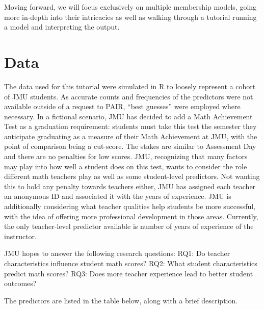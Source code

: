 \documentclass[
]{book}
\begin{document}
Moving forward, we will focus exclusively on multiple membership models, going more in-depth into their intricacies as well as walking through a tutorial running a model and interpreting the output.

\hypertarget{data}{%
\chapter{Data}\label{data}}

The data used for this tutorial were simulated in R to loosely represent a cohort of JMU students. As accurate counts and frequencies of the predictors were not available outside of a request to PAIR, ``best guesses'' were employed where necessary. In a fictional scenario, JMU has decided to add a Math Achievement Test as a graduation requirement: students must take this test the semester they anticipate graduating as a measure of their Math Achievement at JMU, with the point of comparison being a cut-score. The stakes are similar to Assessment Day and there are no penalties for low scores. JMU, recognizing that many factors may play into how well a student does on this test, wants to consider the role different math teachers play as well as some student-level predictors. Not wanting this to hold any penalty towards teachers either, JMU has assigned each teacher an anonymous ID and associated it with the years of experience. JMU is additionally considering what teacher qualities help students be more successful, with the idea of offering more professional development in those areas. Currently, the only teacher-level predictor available is number of years of experience of the instructor.

JMU hopes to answer the following research questions:
RQ1: Do teacher characteristics influence student math scores?
RQ2: What student characteristics predict math scores?
RQ3: Does more teacher experience lead to better student outcomes?

The predictors are listed in the table below, along with a brief description.
\end{document}
